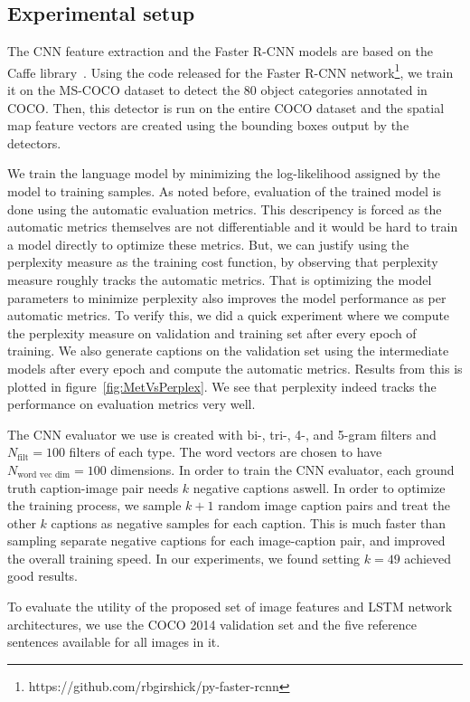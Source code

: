 \subsection{Experimental setup}
The CNN feature extraction and the Faster R-CNN models are based on the Caffe
library~\cite{jia2014caffe}.
Using the code released for the Faster R-CNN
network\footnote{https://github.com/rbgirshick/py-faster-rcnn}, we train it on
the MS-COCO dataset to detect the 80 object categories annotated in COCO.
Then, this detector is run on the entire COCO dataset and the spatial map feature
vectors are created using the bounding boxes output by the detectors.

We train the language model by minimizing the log-likelihood assigned by the
model to training samples.
As noted before, evaluation of the trained model is done using the automatic
evaluation metrics.
This descripency is forced as the automatic metrics themselves are not
differentiable and it would be hard to train a model directly to optimize these
metrics.
But, we can justify using the perplexity measure as the training cost function,
by observing that perplexity measure roughly tracks the automatic metrics.
That is optimizing the model parameters to minimize perplexity also improves the
model performance as per automatic metrics.
To verify this, we did a quick experiment where we compute the perplexity
measure on validation and training set after every epoch of training.
We also generate captions on the validation set using the intermediate models
after every epoch and compute the automatic metrics.
Results from this is plotted in figure~\ref{fig:MetVsPerplex}.
We see that perplexity indeed tracks the performance on evaluation metrics very
well.

The CNN evaluator we use is created with bi-, tri-, 4-, and 5-gram filters and
$N_{\text{filt}}=100$ filters of each type.
The word vectors are chosen to have $N_{\text{word vec dim}}=100$ dimensions.
In order to train the CNN evaluator, each ground truth caption-image pair needs
$k$ negative captions aswell.
In order to optimize the training process, we sample $k+1$ random image caption
pairs and treat the other $k$ captions as negative samples for each caption.
This is much faster than sampling separate negative captions for each
image-caption pair, and improved the overall training speed.
In our experiments, we found setting $k=49$ achieved good results.

To evaluate the utility of the proposed set of image features and LSTM network
architectures, we use the COCO 2014 validation set and the five reference
sentences available for all images in it.


